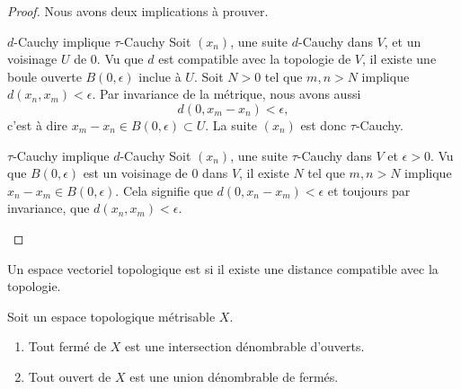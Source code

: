 \begin{proof}
    Nous avons deux implications à prouver.
    \begin{subproof}
    \item[\( d\)-Cauchy implique \( \tau\)-Cauchy]
        Soit \( (x_n)\), une suite \( d\)-Cauchy dans \( V\), et un voisinage \( U\) de \( 0\). Vu que \( d\) est compatible avec la topologie de \( V\), il existe une boule ouverte \( B(0,\epsilon)\) inclue à \( U\). Soit \( N>0\) tel que \( m,n>N\) implique \( d(x_n,x_m)<\epsilon\). Par invariance de la métrique, nous avons aussi
        \begin{equation}
            d(0,x_m-x_n)<\epsilon,
        \end{equation}
        c'est à dire \( x_m-x_n\in B(0,\epsilon)\subset U\). La suite \( (x_n)\) est donc \( \tau\)-Cauchy.
    \item[\( \tau\)-Cauchy implique \( d\)-Cauchy]
        Soit $(x_n)$, une suite \( \tau\)-Cauchy dans \( V\) et \( \epsilon>0\). Vu que \( B(0,\epsilon)\) est un voisinage de \( 0\) dans \( V\), il existe \( N\) tel que \( m,n>N\) implique \( x_n-x_m\in B(0,\epsilon)\). Cela signifie que \( d(0,x_n-x_m)<\epsilon\) et toujours par invariance, que \( d(x_n,x_m)<\epsilon\).
    \end{subproof}
\end{proof}

\begin{definition}
    Un espace vectoriel topologique est  si il existe une distance compatible avec la topologie.
\end{definition}

\begin{proposition}      \label{PROPooXWBTooCvGLOj}
    Soit un espace topologique métrisable \( X\).
    \begin{enumerate}
        \item
            Tout fermé de \( X\) est une intersection dénombrable d'ouverts.
        \item
            Tout ouvert de \( X\) est une union dénombrable de fermés.
    \end{enumerate}
\end{proposition}

